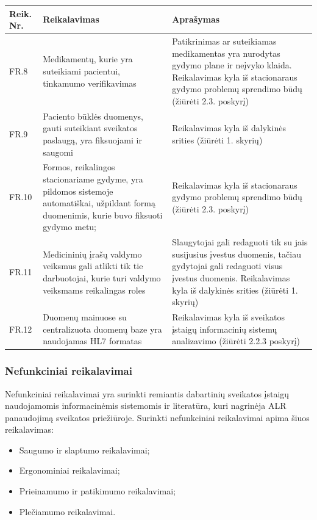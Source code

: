 \begin{table}[!ht]
    \centering
    \renewcommand{\arraystretch}{1.2}
    \renewcommand\thetable{5}

    \begin{tabular}{|m{3em}|m{17em}|m{17em}|}
    \hline 
    \rowcolor[HTML]{EFEFEF} 
    Reik. Nr. & Reikalavimas & Aprašymas \\ \hline
    FR.8  &  Medikamentų, kurie yra suteikiami pacientui, tinkamumo verifikavimas   &  Patikrinimas ar suteikiamas medikamentas yra nurodytas gydymo plane ir neįvyko klaida. Reikalavimas kyla iš stacionaraus gydymo problemų sprendimo būdų  (žiūrėti 2.3. poskyrį)       \\ \hline
    FR.9  &  Paciento būklės duomenys, gauti suteikiant sveikatos paslaugą, yra fiksuojami ir saugomi  &    Reikalavimas kyla iš dalykinės srities (žiūrėti 1. skyrių)       \\ \hline
    FR.10  &  Formos, reikalingos stacionariame gydyme, yra pildomos sistemoje automatiškai, užpildant formą duomenimis, kurie buvo fiksuoti gydymo metu;  &   Reikalavimas kyla iš stacionaraus gydymo problemų sprendimo būdų  (žiūrėti 2.3. poskyrį)       \\ \hline
    FR.11  &  Medicininių įrašų valdymo veiksmus gali atlikti tik tie darbuotojai, kurie turi valdymo veiksmams reikalingas roles  &  
    Slaugytojai gali redaguoti tik su jais susijusius įvestus duomenis, tačiau gydytojai gali redaguoti visus įvestus duomenis. Reikalavimas kyla iš dalykinės srities (žiūrėti 1. skyrių)       \\ \hline
    FR.12  &  Duomenų mainuose su centralizuota duomenų baze yra naudojamas HL7 formatas  &   Reikalavimas kyla iš sveikatos įstaigų informacinių sistemų analizavimo (žiūrėti 2.2.3 poskyrį)       \\ \hline
    \end{tabular}

\end{table}


\subsubsection{Nefunkciniai reikalavimai}
Nefunkciniai reikalavimai yra surinkti remiantis dabartinių sveikatos įstaigų naudojamomis informacinėmis sistemomis ir literatūra, kuri nagrinėja ALR panaudojimą sveikatos priežiūroje. Surinkti nefunkciniai reikalavimai apima šiuos reikalavimas:
\begin{itemize}
    \item Saugumo ir slaptumo reikalavimai;
    \item Ergonominiai reikalavimai;
    \item Prieinamumo ir patikimumo reikalavimai;
    \item Plečiamumo reikalavimai.
\end{itemize}

